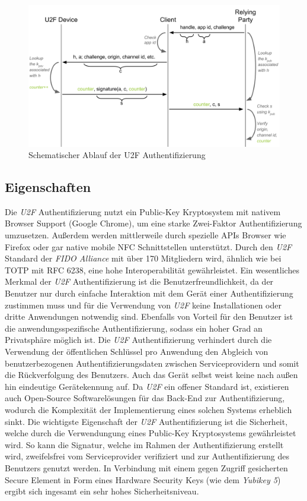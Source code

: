 \documentclass[11pt,a4paper,ngerman]{scrreprt}
\begin{document}
\begin{figure}[htbp]
    \centering
        \includegraphics[width=\textwidth]{Abbildungen/yubico_u2f_flow}
    \caption{Schematischer Ablauf der U2F Authentifizierung \cite{u2fTech}}
    \label{fig:U2F-Auth}
\end{figure}
\subsection{Eigenschaften}
Die \textit{U2F} Authentifizierung nutzt ein Public-Key Kryptosystem mit nativem Browser Support (Google Chrome), um eine starke Zwei-Faktor Authentifizierung umzusetzen. Außerdem werden mittlerweile durch spezielle APIs Browser wie Firefox oder gar native mobile NFC Schnittstellen unterstützt. Durch den \textit{U2F} Standard der \textit{FIDO Alliance} mit über 170 Mitgliedern wird, ähnlich wie bei TOTP mit RFC 6238, eine hohe Interoperabilität gewährleistet. Ein wesentliches Merkmal der \textit{U2F} Authentifizierung ist die Benutzerfreundlichkeit, da der Benutzer nur durch einfache Interaktion mit dem Gerät einer Authentifizierung zustimmen muss und für die Verwendung von \textit{U2F} keine Installationen oder dritte Anwendungen notwendig sind. Ebenfalls von Vorteil für den Benutzer ist die anwendungsspezifische Authentifizierung, sodass ein hoher Grad an Privatsphäre möglich ist. Die \textit{U2F} Authentifizierung verhindert durch die Verwendung der öffentlichen Schlüssel pro Anwendung den Abgleich von benutzerbezogenen Authentifizierungsdaten zwischen Serviceprovidern und somit die Rückverfolgung des Benutzers. Auch das Gerät selbst weist keine nach außen hin eindeutige Gerätekennung auf. Da \textit{U2F} ein offener Standard ist, existieren auch Open-Source Softwarelösungen für das Back-End zur Authentifizierung, wodurch die Komplexität der Implementierung eines solchen Systems erheblich sinkt. Die wichtigste Eigenschaft der \textit{U2F} Authentifizierung ist die Sicherheit, welche durch die Verwendungung eines Public-Key Kryptosystems gewährleistet wird. So kann die Signatur, welche im Rahmen der Authentifizierung erstellt wird, zweifelsfrei vom Serviceprovider verifiziert und zur Authentifizierung des Benutzers genutzt werden. In Verbindung mit einem gegen Zugriff gesicherten Secure Element in Form eines Hardware Security Keys (wie dem \textit{Yubikey 5}) ergibt sich ingesamt ein sehr hohes Sicherheitsniveau.
\end{document}
